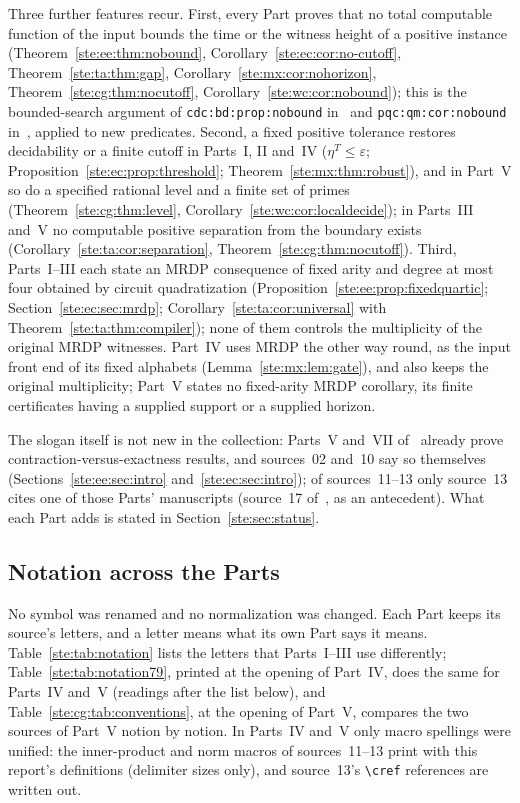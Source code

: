 \documentclass[11pt,letterpaper]{article}
\theoremstyle{definition}
\theoremstyle{remark}
\begin{document}
Three further features recur. First, every Part proves that no total computable function of the input bounds the time or the witness height of a positive instance (Theorem~\ref{ste:ee:thm:nobound}, Corollary~\ref{ste:ec:cor:no-cutoff}, Theorem~\ref{ste:ta:thm:gap}, Corollary~\ref{ste:mx:cor:nohorizon}, Theorem~\ref{ste:cg:thm:nocutoff}, Corollary~\ref{ste:wc:cor:nobound}); this is the bounded-search argument of \texttt{cdc:bd:prop:nobound} in~\cite{cdc} and \texttt{pqc:qm:cor:nobound} in~\cite{pqc}, applied to new predicates. Second, a fixed positive tolerance restores decidability or a finite cutoff in Parts~I, II and~IV ($\eta^T\le\varepsilon$; Proposition~\ref{ste:ec:prop:threshold}; Theorem~\ref{ste:mx:thm:robust}), and in Part~V so do a specified rational level and a finite set of primes (Theorem~\ref{ste:cg:thm:level}, Corollary~\ref{ste:wc:cor:localdecide}); in Parts~III and~V no computable positive separation from the boundary exists (Corollary~\ref{ste:ta:cor:separation}, Theorem~\ref{ste:cg:thm:nocutoff}). Third, Parts~I--III each state an MRDP consequence of fixed arity and degree at most four obtained by circuit quadratization (Proposition~\ref{ste:ee:prop:fixedquartic}; Section~\ref{ste:ec:sec:mrdp}; Corollary~\ref{ste:ta:cor:universal} with Theorem~\ref{ste:ta:thm:compiler}); none of them controls the multiplicity of the original MRDP witnesses. Part~IV uses MRDP the other way round, as the input front end of its fixed alphabets (Lemma~\ref{ste:mx:lem:gate}), and also keeps the original multiplicity; Part~V states no fixed-arity MRDP corollary, its finite certificates having a supplied support or a supplied horizon.

The slogan itself is not new in the collection: Parts~V and~VII of~\cite{pqc} already prove contraction-versus-exactness results, and sources~02 and~10 say so themselves (Sections~\ref{ste:ee:sec:intro} and~\ref{ste:ec:sec:intro}); of sources~11--13 only source~13 cites one of those Parts' manuscripts (source~17 of~\cite{pqc}, as an antecedent). What each Part adds is stated in Section~\ref{ste:sec:status}.

\subsection{Notation across the Parts}\label{ste:sec:notation}

No symbol was renamed and no normalization was changed. Each Part keeps its source's letters, and a letter means what its own Part says it means. Table~\ref{ste:tab:notation} lists the letters that Parts~I--III use differently; Table~\ref{ste:tab:notation79}, printed at the opening of Part~IV, does the same for Parts~IV and~V (readings after the list below), and Table~\ref{ste:cg:tab:conventions}, at the opening of Part~V, compares the two sources of Part~V notion by notion. In Parts~IV and~V only macro spellings were unified: the inner-product and norm macros of sources~11--13 print with this report's definitions (delimiter sizes only), and source~13's \texttt{\textbackslash cref} references are written out.
\end{document}
